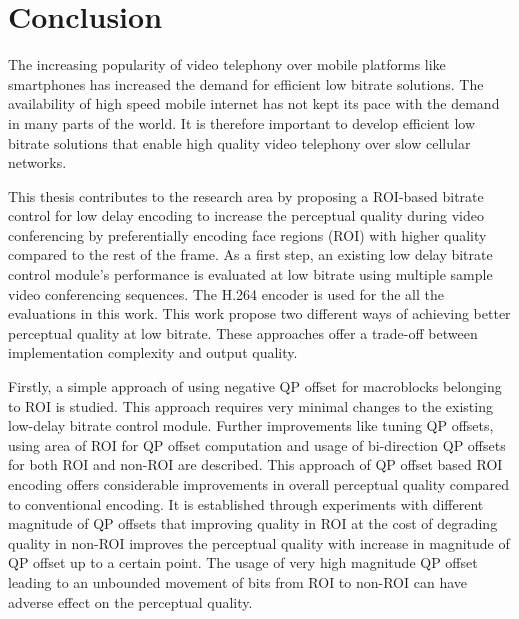 \chapter{Conclusion} \label{chapter:conclusion}
\thispagestyle{empty}%

The increasing popularity of video telephony over mobile platforms like smartphones has increased the demand for efficient low bitrate solutions. The availability of high speed mobile internet has not kept its pace with the demand in many parts of the world. It is therefore important to develop efficient low bitrate solutions that enable high quality video telephony over slow cellular networks. 

This thesis contributes to the research area by proposing a ROI-based bitrate control for low delay encoding to increase the perceptual quality during video conferencing by preferentially encoding face regions (ROI) with higher quality compared to the rest of the frame. As a first step, an existing low delay bitrate control module's performance is evaluated at low bitrate using multiple sample video conferencing sequences. The H.264 encoder is used for the all the evaluations in this work. This work propose two different ways of achieving better perceptual quality at low bitrate. These approaches offer a trade-off between implementation complexity and output quality. 

Firstly, a simple approach of using negative QP offset for macroblocks belonging to ROI is studied. This approach requires very minimal changes to the existing low-delay bitrate control module. Further improvements like tuning QP offsets, using area of ROI for QP offset computation and usage of bi-direction QP offsets for both ROI and non-ROI are described. This approach of QP offset based ROI encoding offers considerable improvements in overall perceptual quality compared to conventional encoding. It is established through experiments with different magnitude of QP offsets that improving quality in ROI at the cost of degrading quality in non-ROI improves the perceptual quality with increase in magnitude of QP offset up to a certain point. The usage of very high magnitude QP offset leading to an unbounded movement of bits from ROI to non-ROI can have adverse effect on the perceptual quality.

